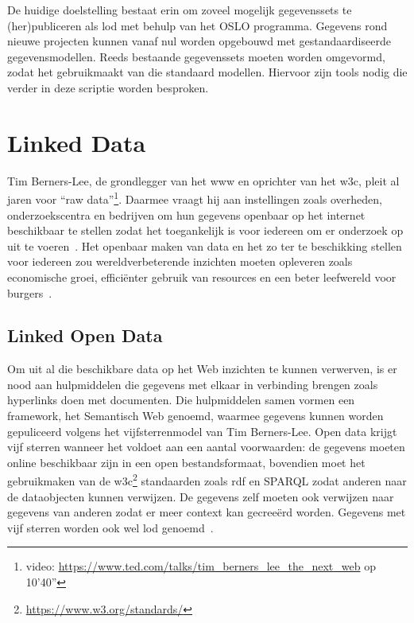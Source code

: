 De huidige doelstelling bestaat erin om zoveel mogelijk gegevenssets te (her)publiceren als \acrshort{lod} met behulp van het OSLO programma. Gegevens rond nieuwe projecten kunnen vanaf nul worden opgebouwd met gestandaardiseerde gegevensmodellen. Reeds bestaande gegevenssets moeten worden omgevormd, zodat het gebruikmaakt van die standaard modellen. Hiervoor zijn tools nodig die verder in deze scriptie worden besproken.

\chapter{Linked Data}
\label{chap:intro}

Tim Berners-Lee, de grondlegger van het \acrfull{www} en oprichter van het \acrfull{w3c}, pleit al jaren voor ``raw data''\footnote{video:  \url{https://www.ted.com/talks/tim_berners_lee_the_next_web} op 10'40''}. Daarmee vraagt hij aan instellingen zoals overheden, onderzoekscentra en bedrijven om hun gegevens openbaar op het internet beschikbaar te stellen zodat het toegankelijk is voor iedereen om er onderzoek op uit te voeren~\cite{tedtalk}. Het openbaar maken van data en het zo ter te beschikking stellen voor iedereen zou wereldverbeterende inzichten moeten opleveren zoals economische groei, efficiënter gebruik van resources en een beter leefwereld voor burgers~\cite{tedtalka}.

\section{Linked Open Data}
\label{sec:linked_open_data}
Om uit al die beschikbare data op het Web inzichten te kunnen verwerven, is er nood aan hulpmiddelen die gegevens met elkaar in verbinding brengen zoals hyperlinks doen met documenten. Die hulpmiddelen samen vormen een framework, het Semantisch Web genoemd, waarmee gegevens kunnen worden gepuliceerd volgens het vijfsterrenmodel van Tim Berners-Lee. Open data krijgt vijf sterren wanneer het voldoet aan een aantal voorwaarden: de gegevens moeten online beschikbaar zijn in een open bestandsformaat, bovendien moet het gebruikmaken van de w3c\footnote{\url{https://www.w3.org/standards/}} standaarden zoals \acrfull{rdf} en SPARQL zodat anderen naar de dataobjecten kunnen verwijzen. De gegevens zelf moeten ook verwijzen naar gegevens van anderen zodat er meer context kan gecreeërd worden. Gegevens met vijf sterren worden ook wel \acrfull{lod} genoemd~\cite{opendata}.

